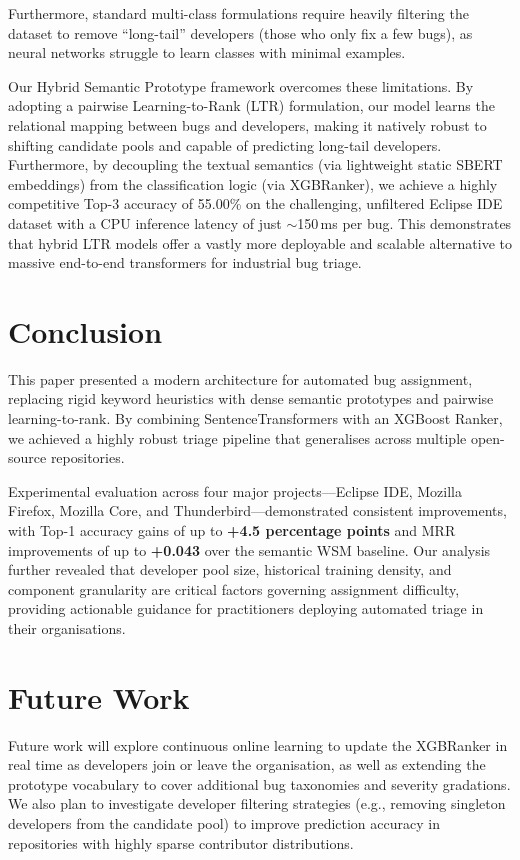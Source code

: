 \documentclass[sigconf,review,anonymous]{acmart}
\begin{document}
Furthermore, standard multi-class formulations require heavily filtering the dataset to remove ``long-tail'' developers (those who only fix a few bugs), as neural networks struggle to learn classes with minimal examples. 

Our Hybrid Semantic Prototype framework overcomes these limitations. By adopting a pairwise Learning-to-Rank (LTR) formulation, our model learns the relational mapping between bugs and developers, making it natively robust to shifting candidate pools and capable of predicting long-tail developers. Furthermore, by decoupling the textual semantics (via lightweight static SBERT embeddings) from the classification logic (via XGBRanker), we achieve a highly competitive Top-3 accuracy of 55.00\% on the challenging, unfiltered Eclipse IDE dataset with a CPU inference latency of just $\sim$150\,ms per bug. This demonstrates that hybrid LTR models offer a vastly more deployable and scalable alternative to massive end-to-end transformers for industrial bug triage.

\section{Conclusion}

This paper presented a modern architecture for automated bug assignment,
replacing rigid keyword heuristics with dense semantic prototypes and
pairwise learning-to-rank.
By combining SentenceTransformers with an XGBoost Ranker, we achieved a
highly robust triage pipeline that generalises across multiple open-source
repositories.

Experimental evaluation across four major projects---Eclipse IDE, Mozilla
Firefox, Mozilla Core, and Thunderbird---demonstrated consistent improvements,
with Top-1 accuracy gains of up to \textbf{+4.5 percentage points} and MRR
improvements of up to \textbf{+0.043} over the semantic WSM baseline.
Our analysis further revealed that developer pool size, historical training
density, and component granularity are critical factors governing assignment
difficulty, providing actionable guidance for practitioners deploying
automated triage in their organisations.

\section{Future Work}

Future work will explore continuous online learning to update the XGBRanker
in real time as developers join or leave the organisation, as well as
extending the prototype vocabulary to cover additional bug taxonomies and
severity gradations. We also plan to investigate developer filtering
strategies (e.g., removing singleton developers from the candidate pool)
to improve prediction accuracy in repositories with highly sparse
contributor distributions.


\end{document}
